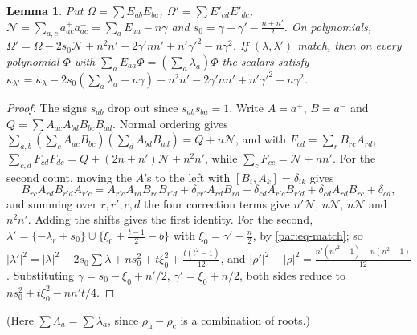 \documentclass[10pt]{amsart}
\newtheorem{lemma}[theorem]{Lemma}
\theoremstyle{definition}
\theoremstyle{remark}
\begin{document}
\begin{lemma}\label{par:casimir}
Put $\Omega=\sum E_{ab}E_{ba}$, $\Omega'=\sum E'_{cd}E'_{dc}$, $\mathcal N=\sum_{a,c}a^+_{ac}a^-_{ac}=
\sum_aE_{aa}-n\gamma$ and $s_0=\gamma+\gamma'-\tfrac{n+n'}2$. On polynomials,
$\Omega'=\Omega-2s_0\mathcal N+n^2n'-2\gamma'nn'+n'\gamma'^2-n\gamma^2$. If $(\lambda,\lambda')$ match,
then on every polynomial $\Phi$ with $\sum_aE_{aa}\Phi=(\sum_a\lambda_a)\Phi$ the scalars satisfy
$\kappa_{\lambda'}=\kappa_\lambda-2s_0(\sum_a\lambda_a-n\gamma)+n^2n'-2\gamma'nn'+n'\gamma'^2-n\gamma^2$.
\end{lemma}
\begin{proof}
The signs $s_{ab}$ drop out since $s_{ab}s_{ba}=1$. Write $A=a^+$, $B=a^-$ and
$Q=\sum A_{ac}A_{bd}B_{bc}B_{ad}$. Normal ordering gives $\sum_{a,b}(\sum_cA_{ac}B_{bc})(\sum_dA_{bd}B_{ad})
=Q+n\mathcal N$, and with $F_{cd}=\sum_rB_{rc}A_{rd}$, $\sum_{c,d}F_{cd}F_{dc}=Q+(2n+n')\mathcal N+n^2n'$,
while $\sum_cF_{cc}=\mathcal N+nn'$. For the second count, moving the $A$'s to the left with $[B_i,A_k]=\delta_{ik}$ gives
\[
B_{rc}A_{rd}B_{r'd}A_{r'c}=A_{r'c}A_{rd}B_{rc}B_{r'd}+\delta_{rr'}A_{rd}B_{rd}+\delta_{cd}A_{r'c}B_{r'd}+\delta_{cd}A_{rd}B_{rc}+\delta_{cd},
\]
and summing over $r,r',c,d$ the four correction terms give $n'\mathcal N$, $n\mathcal N$, $n\mathcal N$ and $n^2n'$. Adding the shifts gives the first identity. For the second,
$\lambda'=\{-\lambda_r+s_0\}\cup\{\xi_0+\tfrac{t-1}2-b\}$ with $\xi_0=\gamma'-\tfrac n2$, by
\eqref{par:eq-match}; so $|\lambda'|^2=|\lambda|^2-2s_0\sum\lambda+ns_0^2+t\xi_0^2+\tfrac{t(t^2-1)}{12}$, and
$|\rho'|^2-|\rho|^2=\tfrac{n'(n'^2-1)-n(n^2-1)}{12}$. Substituting $\gamma=s_0-\xi_0+n'/2$,
$\gamma'=\xi_0+n/2$, both sides reduce to $ns_0^2+t\xi_0^2-nn't/4$.
\end{proof}
(Here $\sum\Lambda_a=\sum\lambda_a$, since $\rho_{\mathrm n}-\rho_{\mathrm c}$ is a combination of roots.)
\end{document}

